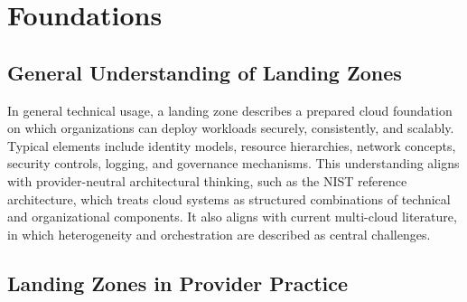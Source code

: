 \section{Foundations}
\label{sec:grundlagen}



\subsection{General Understanding of Landing Zones}

In general technical usage, a landing zone describes a prepared cloud foundation on which organizations can deploy workloads securely, consistently, and scalably. Typical elements include identity models, resource hierarchies, network concepts, security controls, logging, and governance mechanisms. This understanding aligns with provider-neutral architectural thinking, such as the NIST reference architecture, which treats cloud systems as structured combinations of technical and organizational components. It also aligns with current multi-cloud literature, in which heterogeneity and orchestration are described as central challenges.

\subsection{Landing Zones in Provider Practice}

